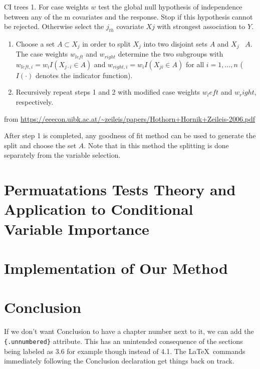 \documentclass[12pt,twoside]{reedthesis}
\begin{document}
  CI trees 1. For case weights \(w\) test the global null hypothesis of
  independence between any of the m covariates and the response. Stop if
  this hypothesis cannot be rejected. Otherwise select the \(j_{th}\)
  covariate \(Xj\) with strongest association to \(Y\).
  
  \begin{enumerate}
  \def\labelenumi{\arabic{enumi}.}
  \setcounter{enumi}{1}
  \item
    Choose a set \(A \subset X_{j}\) in order to split \(X_{j}\) into two
    disjoint sets \(A\) and \(X_{j}\) ~\(A\). The case weights
    \(w_{left}\) and \(w_{right}\) determine the two subgroups with
    \(w_{left,i} = w_iI(X_{j\cdot i} \in A)\) and
    \(w_{right,i} = w_iI(X_{ji} \in A)\) for all \(i = 1,...,n\) (
    \(I(·)\) denotes the indicator function).
  \item
    Recursively repeat steps 1 and 2 with modified case weights \(w_left\)
    and \(w_right\), respectively.
  \end{enumerate}
  
  from
  \url{https://eeecon.uibk.ac.at/~zeileis/papers/Hothorn+Hornik+Zeileis-2006.pdf}
  
  After step 1 is completed, any goodness of fit method can be used to
  generate the split and choose the set \(A\). Note that in this method
  the splitting is done separately from the variable selection.
  
  \chapter{Permuatations Tests Theory and Application to Conditional
  Variable
  Importance}\label{permuatations-tests-theory-and-application-to-conditional-variable-importance}
  
  \chapter{Implementation of Our
  Method}\label{implementation-of-our-method}
  
  \chapter*{Conclusion}\label{conclusion}
  
  \setcounter{chapter}{4} \setcounter{section}{0}
  
  If we don't want Conclusion to have a chapter number next to it, we can
  add the \texttt{\{.unnumbered\}} attribute. This has an unintended
  consequence of the sections being labeled as 3.6 for example though
  instead of 4.1. The \LaTeX~commands immediately following the Conclusion
  declaration get things back on track.
  
\end{document}
